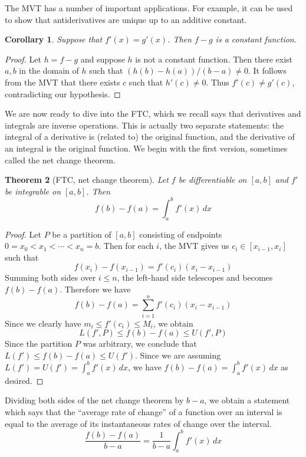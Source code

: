 \documentclass[11pt,oneside]{amsbook}
\theoremstyle{definition}
\theoremstyle{plain}
\newtheorem{theorem}{Theorem}[section]
\newtheorem{corollary}[theorem]{Corollary}
\theoremstyle{definition}
\theoremstyle{remark}
\numberwithin{equation}{section}
\numberwithin{figure}{section}
\begin{document}
The MVT has a number of important applications. For example, it can be used to show that antiderivatives are unique up to an additive constant.

\begin{corollary}
  Suppose that $f'(x)=g'(x)$. Then $f-g$ is a constant function.
\end{corollary}

\begin{proof}
  Let $h=f-g$ and suppose $h$ is not a constant function. Then there exist $a,b$ in the domain of $h$ such that $(h(b)-h(a))/(b-a)\neq0$. It follows from the MVT that there exists $c$ such that $h'(c)\neq0$. Thus $f'(c)\neq g'(c)$, contradicting our hypothesis.
\end{proof}

We are now ready to dive into the FTC, which we recall says that derivatives and integrals are inverse operations. This is actually two separate statements: the integral of a derivative is (related to) the original function, and the derivative of an integral is the original function. We begin with the first version, sometimes called the net change theorem.

\begin{theorem}[FTC, net change theorem]
  Let $f$ be differentiable on $[a,b]$ and $f'$ be integrable on $[a,b]$. Then
  \[f(b)-f(a)=\int_a^b f'(x)\,dx
  \]
\end{theorem}

\begin{proof}
  Let $P$ be a partition of $[a,b]$ consisting of endpoints $0=x_0<x_1<\cdots<x_n=b$. Then for each $i$, the MVT gives us $c_i\in[x_{i-1},x_i]$ such that
  \[f(x_i)-f(x_{i-1})=f'(c_i)(x_i-x_{i-1})
  \]
  Summing both sides over $i\leq n$, the left-hand side telescopes and becomes $f(b)-f(a)$. Therefore we have
  \[f(b)-f(a)=\sum_{i=1}^n f'(c_i)(x_i-x_{i-1})
  \]
  Since we clearly have $m_i\leq f'(c_i)\leq M_i$, we obtain
  \[L(f',P)\leq f(b)-f(a)\leq U(f',P)
  \]
  Since the partition $P$ was arbitrary, we conclude that $L(f')\leq f(b)-f(a)\leq U(f')$. Since we are assuming $L(f')=U(f')=\int_a^bf'(x)\,dx$, we have $f(b)-f(a)=\int_a^bf'(x)\,dx$ as desired.
\end{proof}

Dividing both sides of the net change theorem by $b-a$, we obtain a statement which says that the ``average rate of change'' of a function over an interval is equal to the average of its instantaneous rates of change over the interval.
\[\frac{f(b)-f(a)}{b-a}=\frac{1}{b-a}\int_a^b f'(x)\,dx
\]
\end{document}
